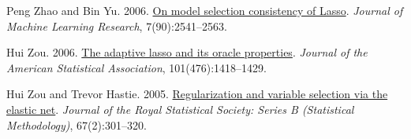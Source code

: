 \documentclass[10pt,letterpaper]{article}
\begin{document}
\begin{thebibliography}{}
Peng Zhao and Bin Yu. 2006.
\href{https://jmlr.org/papers/v7/zhao06a.html}{On model selection consistency of Lasso}.
\emph{Journal of Machine Learning Research}, 7(90):2541--2563.

Hui Zou. 2006.
\href{https://doi.org/10.1198/016214506000000735}{The adaptive lasso and its oracle properties}.
\emph{Journal of the American Statistical Association}, 101(476):1418--1429.

Hui Zou and Trevor Hastie. 2005.
\href{https://doi.org/10.1111/j.1467-9868.2005.00503.x}{Regularization and variable selection via the elastic net}.
\emph{Journal of the Royal Statistical Society: Series B (Statistical Methodology)}, 67(2):301--320.

\end{thebibliography}
\endgroup
\end{document}

